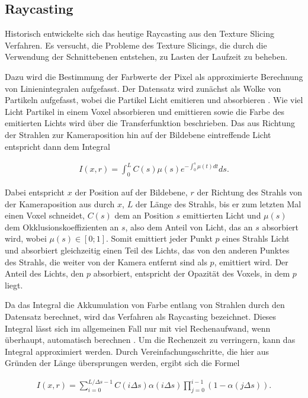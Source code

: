 \documentclass[a4paper,fontsize=12pt,toc=bib,parskip=half,ngerman]{scrartcl}
\begin{document}
\subsection{Raycasting}
\label{sec:Raycasting}

Historisch entwickelte sich das heutige Raycasting aus den Texture Slicing Verfahren. Es versucht, die Probleme des Texture Slicings, die durch die Verwendung der Schnittebenen entstehen, zu Lasten der Laufzeit zu beheben.

Dazu wird die Bestimmung der Farbwerte der Pixel als approximierte Berechnung von Linienintegralen aufgefasst. Der Datensatz wird zun\"achst als Wolke von Partikeln aufgefasst, wobei die Partikel Licht emitieren und absorbieren \cite[s.~134~f.]{hansen2005visualization}. Wie viel Licht Partikel in einem Voxel absorbieren und emittieren sowie die Farbe des emitierten Lichts wird \"uber die Transferfunktion beschrieben. Das aus Richtung der Strahlen zur Kameraposition hin auf der Bildebene eintreffende Licht entspricht dann dem Integral 

\begin{align}
I(x,r) = \int_{0}^{L} C(s)\mu(s) e^{-\int_{0}^{s}\mu(t)dt}ds.
\end{align}

Dabei entspricht $x$ der Position auf der Bildebene, $r$ der Richtung des Strahls von der Kameraposition aus durch $x$, $L$ der L\"ange des Strahls, bis er zum letzten Mal einen Voxel schneidet, $C(s)$ dem an Position $s$ emittierten Licht und $\mu(s)$ dem Okklusionskoeffizienten an $s$, also dem Anteil von Licht, das an $s$ absorbiert wird, wobei $\mu(s) \in [0;1]$. Somit emittiert jeder Punkt $p$ eines Strahls Licht und absorbiert gleichzeitig einen Teil des Lichts, das von den anderen Punktes des Strahls, die weiter von der Kamera entfernt sind als $p$, emittiert wird. Der Anteil des Lichts, den $p$ absorbiert, entspricht der Opazit\"at des Voxels, in dem $p$ liegt.

Da das Integral die Akkumulation von Farbe entlang von Strahlen durch den Datensatz berechnet, wird das Verfahren als Raycasting bezeichnet. Dieses Integral l\"asst sich im allgemeinen Fall nur mit viel Rechenaufwand, wenn \"uberhaupt, automatisch berechnen \cite[S.~136]{hansen2005visualization}. Um die Rechenzeit zu verringern, kann das Integral approximiert werden. Durch Vereinfachungsschritte, die hier aus Gr\"unden der L\"ange \"ubersprungen werden, ergibt sich die Formel

\begin{align}
I(x,r) = \sum_{i=0}^{L/\Delta s - 1} C(i\Delta s)\alpha(i\Delta s) \prod_{j=0}^{i-1}( 1 - \alpha(j \Delta s)).
\end{align}
\end{document}
